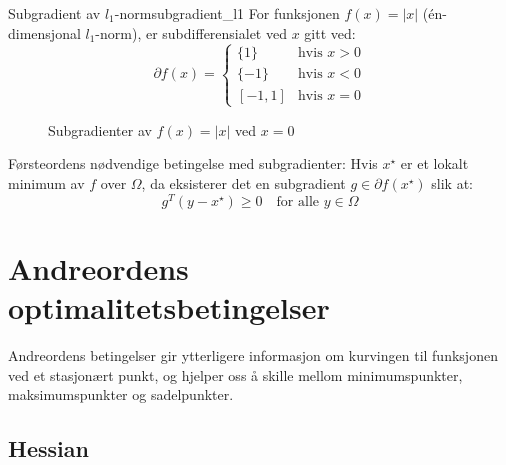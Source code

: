 \begin{example}{Subgradient av $l_1$-norm}{subgradient_l1}
	For funksjonen $f(x) = |x|$ (én-dimensjonal $l_1$-norm), er subdifferensialet ved $x$ gitt ved:
	\[
		\partial f(x) = \begin{cases}
			\{1\}   & \text{hvis } x > 0 \\
			\{-1\}  & \text{hvis } x < 0 \\
			[-1, 1] & \text{hvis } x = 0
		\end{cases}
	\]

	\begin{figure}[H]
		\centering
		\caption{Subgradienter av $f(x) = |x|$ ved $x = 0$}
		\label{fig:subgradient_l1}
	\end{figure}
\end{example}

Førsteordens nødvendige betingelse med subgradienter: Hvis $x^\star$ er et lokalt minimum av $f$ over $\Omega$, da eksisterer det en subgradient $g \in \partial f(x^\star)$ slik at:
\[
	g^T (y - x^\star) \geq 0 \quad \text{for alle } y \in \Omega
\]

\section{Andreordens optimalitetsbetingelser}

Andreordens betingelser gir ytterligere informasjon om kurvingen til funksjonen ved et stasjonært punkt, og hjelper oss å skille mellom minimumspunkter, maksimumspunkter og sadelpunkter.

\subsection{Hessian}

